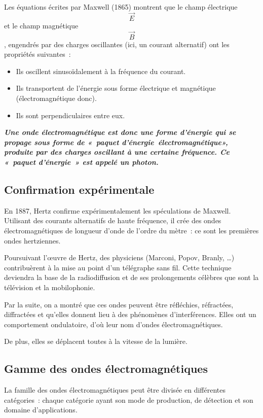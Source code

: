 Les équations écrites par Maxwell (1865) montrent que le champ
électrique \[\overrightarrow{E}{}\] et le champ
magnétique\[\overrightarrow{B}{}\], engendrés par des charges
oscillantes (ici, un courant alternatif) ont les propriétés suivantes~:

\begin{itemize}
\item  Ils oscillent sinusoïdalement à la fréquence du courant.
\item  Ils transportent de l'énergie sous forme électrique et magnétique
  (électromagnétique donc).
\item  Ils sont perpendiculaires entre eux.
\end{itemize}

\emph{\textbf{Une onde électromagnétique est donc une forme d'énergie
qui se propage sous forme de «~paquet d'énergie~électromagnétique»,
produite par des charges oscillant à une certaine fréquence. Ce «~paquet
d'énergie~» est appelé un photon. }}

\subsection{Confirmation expérimentale}

En 1887, Hertz confirme expérimentalement les spéculations de Maxwell.
Utilisant des courants alternatifs de haute fréquence, il crée des ondes
électromagnétiques de longueur d'onde de l'ordre du mètre~: ce sont les
premières ondes hertziennes.

Poursuivant l'œuvre de Hertz, des physiciens (Marconi, Popov, Branly,
\ldots) contribuèrent à la mise au point d'un télégraphe sans fil. Cette
technique deviendra la base de la radiodiffusion et de ses prolongements
célèbres que sont la télévision et la mobilophonie.

Par la suite, on a montré que ces ondes peuvent être réfléchies,
réfractées, diffractées et qu'elles donnent lieu à des phénomènes
d'interférences. Elles ont un comportement ondulatoire, d'où leur nom
d'ondes électromagnétiques.

De plus, elles se déplacent toutes à la vitesse de la lumière.

\subsection{Gamme des ondes électromagnétiques}

La famille des ondes électromagnétiques peut être divisée en différentes
catégories~: chaque catégorie ayant son mode de production, de détection
et son domaine d'applications.

